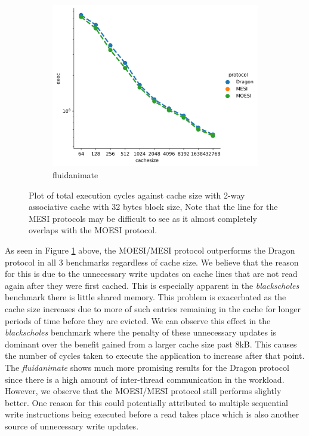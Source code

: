 \documentclass[nonacm,acmsmall,screen,11pt]{acmart}
\begin{document}
\begin{figure}[htb!]
  \begin{subfigure}{0.32\textwidth}
    \includegraphics[width=\columnwidth]{cachesize-fluidanimate}
    \caption{fluidanimate}
  \end{subfigure}
  \caption{Plot of total execution cycles against cache size with 2-way associative cache with 32 bytes block size, Note that the line for the MESI protocols may be difficult to see as it almost completely overlaps with the MOESI protocol.}
  \label{fig:cachesize}
\end{figure}
As seen in Figure \ref{fig:cachesize} above, the MOESI/MESI protocol outperforms the Dragon protocol in all 3 benchmarks regardless of cache size. We believe that the reason for this is due to the unnecessary write updates on cache lines that are not read again after they were first cached. This is especially apparent in the \textit{blackscholes} benchmark there is little shared memory. This problem is exacerbated as the cache size increases due to more of such entries remaining in the cache for longer periods of time before they are evicted. We can observe this effect in the \textit{blackscholes} benchmark where the penalty of these unnecessary updates is dominant over the benefit gained from a larger cache size past 8kB. This causes the number of cycles taken to execute the application to increase after that point.
The \textit{fluidanimate} shows much more promising results for the Dragon protocol since there is a high amount of inter-thread communication in the workload. However, we observe that the MOESI/MESI protocol still performs slightly better. One reason for this could potentially attributed to multiple sequential write instructions being executed before a read takes place which is also another source of unnecessary write updates. 
\end{document}
